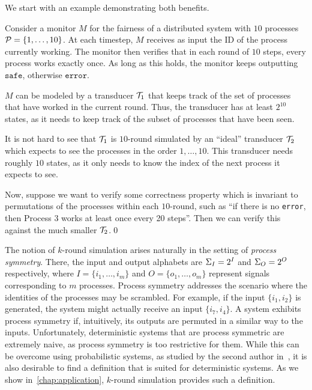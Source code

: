 We start with an example demonstrating both benefits.
\begin{example}
\label{example:MC_rounds}
Consider a monitor $M$ for the fairness of a distributed system with $10$ processes $\mathcal{P}=\{1,\ldots,10\}$. At each timestep, $M$ receives as input the ID of the process currently working. The monitor then verifies that in each round of $10$ steps, every process works exactly once. As long as this holds, the monitor keeps outputting $\texttt{safe}$, otherwise $\texttt{error}$.

$M$ can be modeled by a transducer $\mathcal{T}_1$ that keeps track of the set of processes that have worked in the current round. Thus, the transducer has at least $2^{10}$ states, as it needs to keep track of the subset of processes that have been seen.

It is not hard to see that $\mathcal{T}_1$ is $10$-round simulated by an ``ideal'' transducer $\mathcal{T}_2$ which expects to see the processes in the order $1,\ldots,10$. This transducer needs roughly $10$ states, as it only needs to know the index of the next process it expects to see.

Now, suppose we want to verify some correctness property which is invariant to permutations of the processes within each $10$-round, such as ``if there is no \texttt{error}, then Process $3$ works at least once every 20 steps''. Then we can verify this against the much smaller $\mathcal{T}_2$.\qed
\end{example}

The notion of $k$-round simulation arises naturally in the setting of \emph{process symmetry}. There, the input and output alphabets are $\Sigma_{I}=2^{I}$ and $\Sigma_{O}=2^{O}$ respectively, where $I=\{i_1,\ldots,i_m\}$ and $O=\{o_1,\ldots,o_m\}$ represent signals corresponding to $m$ processes. Process symmetry addresses the scenario where the identities of the processes may be scrambled. For example, if the input $\{i_1,i_2\}$ is generated, the system might actually receive an input $\{i_7,i_4\}$. A system exhibits process symmetry if, intuitively, its outputs are permuted in a similar way to the inputs. Unfortunately, deterministic systems that are process symmetric are extremely naive, as process symmetry is too restrictive for them. While this can be overcome using probabilistic systems, as studied by the second author in~\cite{Almagor2020b}, it is also desirable to find a definition that is suited for deterministic systems. As we show in~\autoref{chap:application}, $k$-round simulation provides such a definition.


